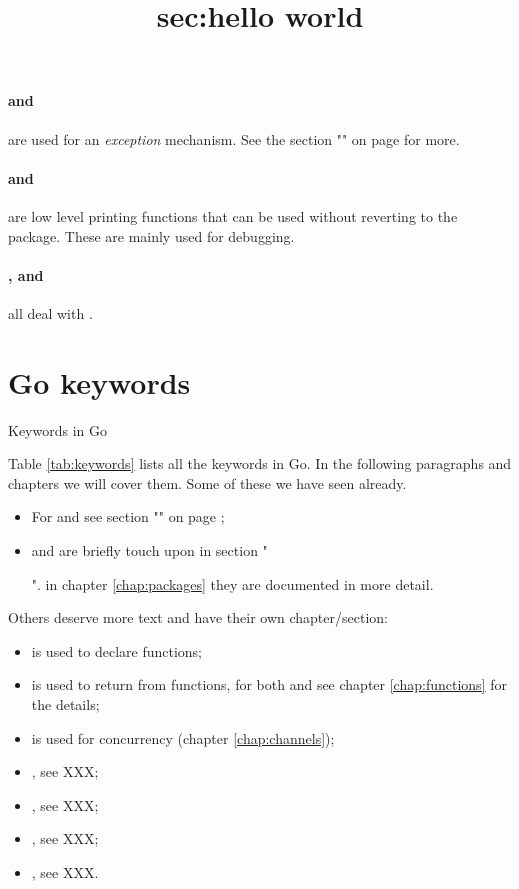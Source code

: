 \paragraph{ and } are used for an 
\emph{exception} mechanism. See the section "" on 
page \pageref{sec:panic} for more.

\paragraph{ and } are low level printing
functions that can be used without reverting to the
package. These are mainly used for debugging.

\paragraph{,  and } all deal with
. 

\section{Go keywords}
\begin{table}[H]
\begin{center}
\caption{Keywords in Go}
\label{tab:keywords}

\end{center}
\end{table}
Table \ref{tab:keywords} lists all the keywords in Go. 
In the following paragraphs and chapters we will cover them. Some
of these we have seen already.
\begin{itemize}
\item For  and  see section "" on 
page \pageref{sec:vars};
\item {} and  are briefly touch upon in section "\title{sec:hello
world}". in chapter \ref{chap:packages} they are documented in more detail.
\end{itemize}
Others deserve more text and have their own chapter/section:
\begin{itemize}
\item {} is used to declare functions;
\item {} is used to return from functions, for both 
and  see chapter \ref{chap:functions} for the details;
\item {} is used for concurrency (chapter \ref{chap:channels});
\item {}, see XXX;
\item {}, see XXX;
\item {}, see XXX;
\item {}, see XXX.
\end{itemize}


